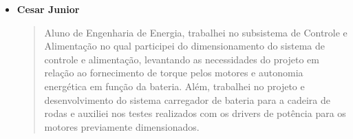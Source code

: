 \begin{itemize}
    \item \textbf{Cesar Junior}
    \begin{quote}
      Aluno de Engenharia de Energia, trabalhei no subsistema de Controle e 
      Alimentação no qual participei do dimensionamento do sistema 
      de controle e alimentação, levantando as necessidades do projeto em 
      relação ao fornecimento de torque pelos motores e autonomia energética 
      em função da bateria. Além, trabalhei no projeto e desenvolvimento do 
      sistema carregador de bateria para a cadeira de rodas e auxiliei nos 
      testes realizados com os drivers de potência para os motores previamente 
      dimensionados.
    \end{quote}
\end{itemize}
